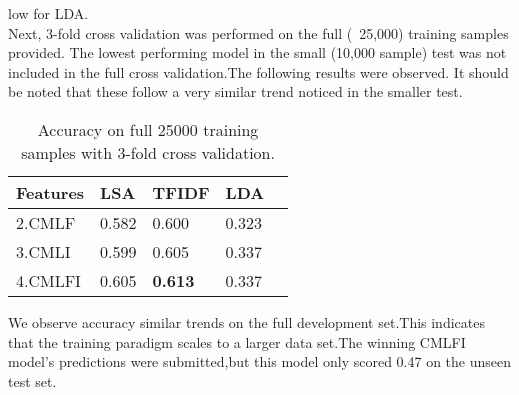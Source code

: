 \documentclass[11pt]{article}
\begin{document}
low for LDA.\\
Next, 3-fold cross validation was performed on the full (~25,000) training
samples provided.  The lowest performing
model in the small (10,000 sample) test was not included in the full cross
validation.The following results were observed. It should be noted that these
follow a very similar trend noticed in the smaller test.\\
\begin{table}[h]
\begin{center}
\begin{singlespace}
\begin{tabular}{|l|l|l|l|l|}
\hline \bf Features & \bf LSA & \bf TFIDF  & \bf LDA \\ \hline
2.CMLF &0.582 & 0.600&0.323\\
3.CMLI & 0.599 & 0.605&0.337\\
4.CMLFI&0.605&\bf{0.613} &0.337 \\
\hline
\end{tabular}
\end{singlespace}
\end{center}
\caption{ Accuracy on full 25000 training samples with 3-fold cross validation.}
\end{table}
We observe accuracy similar trends on the full development set.This indicates
that the training paradigm scales to a larger data set.The winning CMLFI model's
predictions were submitted,but this model only scored 0.47 on the unseen test
set.

{} 
\end{document}
